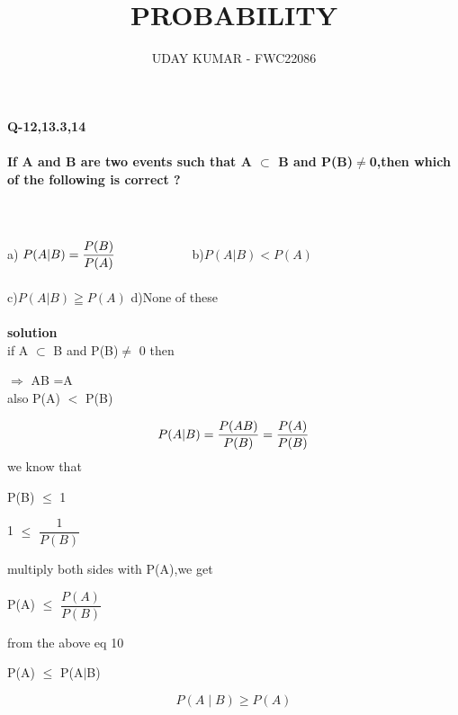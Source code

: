 \documentclass{article}
\begin{document}
\title{PROBABILITY}
\author{\Large UDAY KUMAR - FWC22086}
\date{}

\maketitle
\paragraph*{\large Q-12,13.3,14}
\paragraph*{\large If A and B are two events such that A $\subset$ B and P(B)$\neq$0,then which of the following is correct ? }
\hspace{15mm}\\
\\
a) $P(A|B) = \dfrac{P(B)}{P(A)}\hspace{20mm}$ b)$P(A|B) < P(A)$
\\
\\
c)$P(A|B) \geqq P(A)$ \hspace{21mm} d)None of these\\
\\
\textbf{solution}\\
if A $\subset$ B and P(B)$\neq$ 0 then \\
\begin{center}
$\Rightarrow$ AB =A\\
also P(A) $<$ P(B)\\\vspace{2mm}
\end{center}
\begin{equation}
P(A|B) = \dfrac{P(A B)}{P(B)}=\dfrac{P(A)}{P(B)}\\
\end{equation}
we know that \\
\begin{center}
P(B) $\leq$ 1
\end{center}
\begin{center}
1 $\leq$ $\dfrac{1}{P(B)}$
\end{center}
multiply both sides with P(A),we get 
\begin{center}
P(A) $\leq$ $\dfrac{P(A)}{P(B)}$
\end{center}
from the above eq 10
\begin{center}
P(A) $\leq$ P(A$\mid$B)
\end{center}
\begin{equation}
\boxed{ P(A \mid B)\geq P(A)}
\end{equation}
\end{document}
